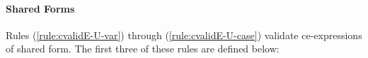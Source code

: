 \paragraph{Shared Forms} Rules (\ref*{rule:cvalidE-U-var}) through (\ref*{rule:cvalidE-U-case}) validate ce-expressions of shared form. The first three of these rules are defined below:
